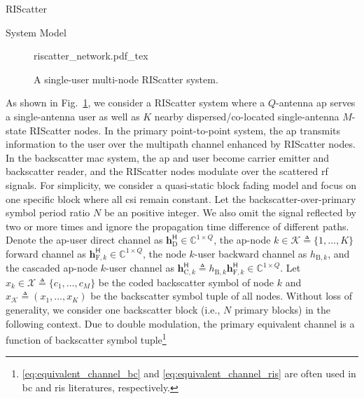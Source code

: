 \documentclass[journal]{IEEEtran}
\begin{document}
\begin{section}{RIScatter}
	\begin{subsection}{System Model}
		\begin{figure}[!t]
			\centering
			\def\svgwidth{0.7\columnwidth}
			\footnotesize{
				{riscatter_network.pdf_tex}
			}
			\caption{A single-user multi-node RIScatter system.}
			\label{fg:riscatter_network}
		\end{figure}
		As shown in Fig.~\ref{fg:riscatter_network}, we consider a RIScatter system where a $Q$-antenna \gls{ap} serves a single-antenna user as well as $K$ nearby dispersed/co-located single-antenna $M$-state RIScatter nodes.
		In the primary point-to-point system, the \gls{ap} transmits information to the user over the multipath channel enhanced by RIScatter nodes.
		In the backscatter \gls{mac} system, the \gls{ap} and user become carrier emitter and backscatter reader, and the RIScatter nodes modulate over the scattered \gls{rf} signals.
		For simplicity, we consider a quasi-static block fading model and focus on one specific block where all \gls{csi} remain constant.
		Let the backscatter-over-primary symbol period ratio $N$ be an positive integer.
		We also omit the signal reflected by two or more times and ignore the propagation time difference of different paths.
		Denote the \gls{ap}-user direct channel as $\boldsymbol{h}_{\text{D}}^\mathsf{H} \in \mathbb{C}^{1 \times Q}$, the \gls{ap}-node $k \in \mathcal{K} \triangleq \{1,\ldots,K\}$ forward channel as $\boldsymbol{h}_{\text{F},k}^\mathsf{H} \in \mathbb{C}^{1 \times Q}$, the node $k$-user backward channel as $h_{\text{B},k}$, and the cascaded \gls{ap}-node $k$-user channel as $\boldsymbol{h}_{\text{C},k}^\mathsf{H} \triangleq h_{\text{B},k} \boldsymbol{h}_{\text{F},k}^\mathsf{H} \in \mathbb{C}^{1 \times Q}$.
		Let $x_k \in \mathcal{X} \triangleq \{c_1,\ldots,c_M\}$ be the coded backscatter symbol of node $k$ and $x_{\mathcal{K}} \triangleq (x_1,\ldots,x_K)$ be the backscatter symbol tuple of all nodes.
		Without loss of generality, we consider one backscatter block (i.e., $N$ primary blocks) in the following context.
		Due to double modulation, the primary equivalent channel is a function of backscatter symbol tuple\footnote{\eqref{eq:equivalent_channel_bc} and \eqref{eq:equivalent_channel_ris} are often used in \gls{bc} and \gls{ris} literatures, respectively.}

\end{subsection}
\end{section}
\end{document}
